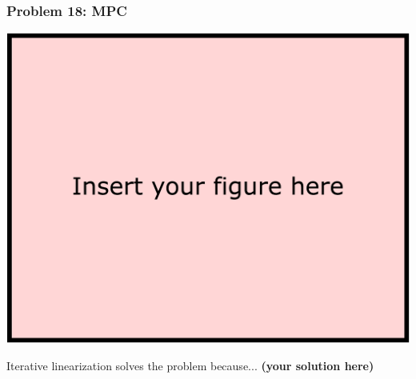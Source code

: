 \documentclass[12pt,twoside]{article}
\newcommand\redt[1]{ {\textcolor[rgb]{0.60, 0.00, 0.00}{\textbf{ #1} } } }
\newcommand{\yoursolution}{ \redt{(your solution here) } }
\begin{document}
\subsubsection*{{\color{red}Problem 18:  MPC}}
			
		\begin{center}\includegraphics[width=.8\linewidth]{figures/your_answer}%
	\end{center}
		Iterative linearization solves the problem because... \yoursolution
	
\end{document}
